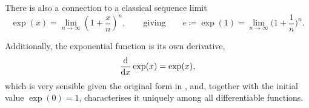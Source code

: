 \documentclass{article}
\begin{document}
There is also a connection to a classical sequence limit
\begin{equation*}
	\exp(x) = \lim_{n \to \infty} \!\left(1 + \frac{x}{n}\right)^n\!, \qquad\text{giving}\qquad e \coloneqq \exp(1) = \lim_{n \to \infty} \!\Big(1 + \frac{1}{n}\Big)^n.
\end{equation*}

Additionally, the exponential function is its own derivative, 
\[
	\frac{\textup{d}}{\textup{d}x} \exp(x) = \exp(x),
\]
which is very sensible given the original form in  , and, together with the initial value $\exp(0) = 1$, characterises it uniquely among all differentiable functions.
\end{document}
